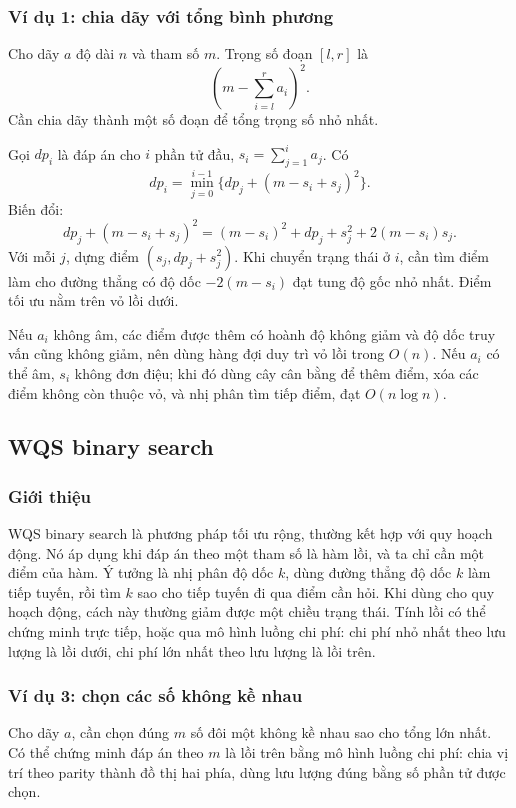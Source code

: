 \documentclass[11pt]{article}
\begin{document}
\subsubsection{Ví dụ 1: chia dãy với tổng bình phương}

Cho dãy \(a\) độ dài \(n\) và tham số \(m\). Trọng số đoạn \([l,r]\) là
\[
  \left(m-\sum_{i=l}^r a_i\right)^2.
\]
Cần chia dãy thành một số đoạn để tổng trọng số nhỏ nhất.

Gọi \(dp_i\) là đáp án cho \(i\) phần tử đầu, \(s_i=\sum_{j=1}^i a_j\). Có
\[
  dp_i=\min_{j=0}^{i-1}\{dp_j+(m-s_i+s_j)^2\}.
\]
Biến đổi:
\[
  dp_j+(m-s_i+s_j)^2
  =(m-s_i)^2+dp_j+s_j^2+2(m-s_i)s_j.
\]
Với mỗi \(j\), dựng điểm \((s_j,dp_j+s_j^2)\). Khi chuyển trạng thái ở \(i\),
cần tìm điểm làm cho đường thẳng có độ dốc \(-2(m-s_i)\) đạt tung độ gốc nhỏ
nhất. Điểm tối ưu nằm trên vỏ lồi dưới.

Nếu \(a_i\) không âm, các điểm được thêm có hoành độ không giảm và độ dốc truy
vấn cũng không giảm, nên dùng hàng đợi duy trì vỏ lồi trong \(O(n)\). Nếu
\(a_i\) có thể âm, \(s_i\) không đơn điệu; khi đó dùng cây cân bằng để thêm
điểm, xóa các điểm không còn thuộc vỏ, và nhị phân tìm tiếp điểm, đạt
\(O(n\log n)\).

\subsection{WQS binary search}

\subsubsection{Giới thiệu}

WQS binary search là phương pháp tối ưu rộng, thường kết hợp với quy hoạch
động. Nó áp dụng khi đáp án theo một tham số là hàm lồi, và ta chỉ cần một
điểm của hàm. Ý tưởng là nhị phân độ dốc \(k\), dùng đường thẳng độ dốc \(k\)
làm tiếp tuyến, rồi tìm \(k\) sao cho tiếp tuyến đi qua điểm cần hỏi. Khi dùng
cho quy hoạch động, cách này thường giảm được một chiều trạng thái. Tính lồi
có thể chứng minh trực tiếp, hoặc qua mô hình luồng chi phí: chi phí nhỏ nhất
theo lưu lượng là lồi dưới, chi phí lớn nhất theo lưu lượng là lồi trên.

\subsubsection{Ví dụ 3: chọn các số không kề nhau}

Cho dãy \(a\), cần chọn đúng \(m\) số đôi một không kề nhau sao cho tổng lớn
nhất. Có thể chứng minh đáp án theo \(m\) là lồi trên bằng mô hình luồng chi
phí: chia vị trí theo parity thành đồ thị hai phía, dùng lưu lượng đúng bằng
số phần tử được chọn.
\end{document}
